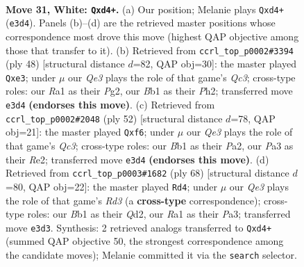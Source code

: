 \documentclass[11pt]{article}
\begin{document}
\clearpage

\begin{figure}[p]\centering
\begin{subfigure}{0.46\textwidth}\centering
\resizebox{\linewidth}{!}{%
\newchessgame
\chessboard[
  setfen={r2r4/pp3pk1/8/7p/bP1qP3/P3Q1Pp/5P2/RB2R1K1 w - - 3 31},
  showmover=false,
  pgfstyle=straightmove, color=movearrow, markmove={e3-d4}
]}
\caption{}
\end{subfigure}\hfill
\begin{subfigure}{0.46\textwidth}\centering
\resizebox{\linewidth}{!}{%
\newchessgame
\chessboard[
  setfen={r1b1r1k1/5pB1/2p4p/ppP5/8/P1Q1qP2/1P4PP/1KR4R w - - 0 25},
  showmover=false,
  pgfstyle=straightmove, color=movearrow, markmove={c3-e3}
]}
\caption{}
\end{subfigure}
\\[4pt]
\begin{subfigure}{0.46\textwidth}\centering
\resizebox{\linewidth}{!}{%
\newchessgame
\chessboard[
  setfen={3r1rk1/p1p3pp/2P2q2/8/8/2Q2P2/PP2R2P/2R4K w - - 3 27},
  showmover=false,
  pgfstyle=straightmove, color=movearrow, markmove={c3-f6}
]}
\caption{}
\end{subfigure}\hfill
\begin{subfigure}{0.46\textwidth}\centering
\resizebox{\linewidth}{!}{%
\newchessgame
\chessboard[
  setfen={2r3k1/4br1p/p2p2p1/6P1/p1q1P3/P1BR4/1P1Q4/K3R3 w - - 2 35},
  showmover=false,
  pgfstyle=straightmove, color=movearrow, markmove={d3-d4}
]}
\caption{}
\end{subfigure}
\caption{\textbf{Move 31, White: \texttt{Qxd4+}.} (a) Our position; Melanie plays \texttt{Qxd4+} (\texttt{e3d4}). Panels (b)--(d) are the retrieved master positions whose correspondence most drove this move (highest QAP objective among those that transfer to it). (b) Retrieved from \texttt{ccrl\_top\_p0002\#3394} (ply 48) [structural distance $d$=82, QAP obj=30]: the master played \texttt{Qxe3}; under $\mu$ our \emph{Qe3} plays the role of that game's \emph{Qc3}; cross-type roles: our \emph{R}a1 as their \emph{P}g2, our \emph{B}b1 as their \emph{P}h2; transferred move \texttt{e3d4} \textbf{(endorses this move)}. (c) Retrieved from \texttt{ccrl\_top\_p0002\#2048} (ply 52) [structural distance $d$=78, QAP obj=21]: the master played \texttt{Qxf6}; under $\mu$ our \emph{Qe3} plays the role of that game's \emph{Qc3}; cross-type roles: our \emph{B}b1 as their \emph{P}a2, our \emph{P}a3 as their \emph{R}e2; transferred move \texttt{e3d4} \textbf{(endorses this move)}. (d) Retrieved from \texttt{ccrl\_top\_p0003\#1682} (ply 68) [structural distance $d$=80, QAP obj=22]: the master played \texttt{Rd4}; under $\mu$ our \emph{Qe3} plays the role of that game's \emph{Rd3} (a \textbf{cross-type} correspondence); cross-type roles: our \emph{B}b1 as their \emph{Q}d2, our \emph{R}a1 as their \emph{P}a3; transferred move \texttt{e3d3}. Synthesis: 2 retrieved analogs transferred to \texttt{Qxd4+} (summed QAP objective 50, the strongest correspondence among the candidate moves); Melanie committed it via the \texttt{search} selector.}
\label{fig:thought-m60}
\end{figure}
\end{document}
